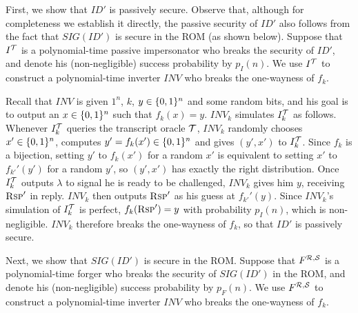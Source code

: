 First, we show that $ID'$ is passively secure. Observe that, although for
completeness we establish it directly, the passive security of $ID'$ also
follows from the fact that $SIG(ID')$ is secure in the ROM (as shown below).
Suppose that $I^{\mathcal{T}}$ is a polynomial-time passive impersonator who breaks
the security of $ID'$, and denote his (non-negligible) success probability by
$p_I(n)$. We use $I^{\mathcal{T}}$ to construct a polynomial-time inverter $INV$ who
breaks the one-wayness of $f_k$. 

Recall that $INV$ is given $1^n$, $k$, $y \in \{0,1\}^{n}$ and some random
bits, and his goal is to output an $x \in \{0,1\}^{n}$ such that 
$f_k(x) = y$. 
$INV_k$ simulates $I_k^{\mathcal{T}}$ as follows. Whenever $I_k^{\mathcal{T}}$ queries the
transcript oracle $\mathcal{T}$, $INV_k$ randomly chooses $x' \in \{0,1\}^{n}$,
computes $y' = f_k(x') \in \{0,1\}^{n}$ and gives $(y',x')$ to $I_k^{\mathcal{T}}$.
Since $f_k$ is a bijection, setting $y'$ to $f_k(x')$ for a random $x'$ is
equivalent to setting $x'$ to 
$f_{k'}'(y')$ for a random $y'$, so $(y',x')$
has exactly the right distribution. Once $I^{\mathcal{T}}_k$ outputs $\lambda$ to
signal he is ready to be challenged, $INV_k$ gives him $y$, receiving
$\textsc{Rsp}'$ in reply. $INV_k$ then outputs $\textsc{Rsp}'$ 
as his guess at 
$f_{k'}'(y)$. Since $INV_k$'s simulation of $I^{\mathcal{T}}_k$ is
perfect, $f_k(\textsc{Rsp}') = y$ with probability $p_I(n)$, which is
non-negligible. $INV_k$ therefore breaks the one-wayness of $f_k$, so
that $ID'$ is passively secure.

Next, we show that $SIG(ID')$ is secure in the ROM.  Suppose that
$F^{\mathcal{R},\mathcal{S}}$ is a polynomial-time forger who breaks the security of
$SIG(ID')$ in the ROM, and denote his (non-negligible) success probability by
$p_F(n)$. We use $F^{\mathcal{R},\mathcal{S}}$ to construct a polynomial-time inverter
$INV$ who breaks the one-wayness of $f_k$. 

